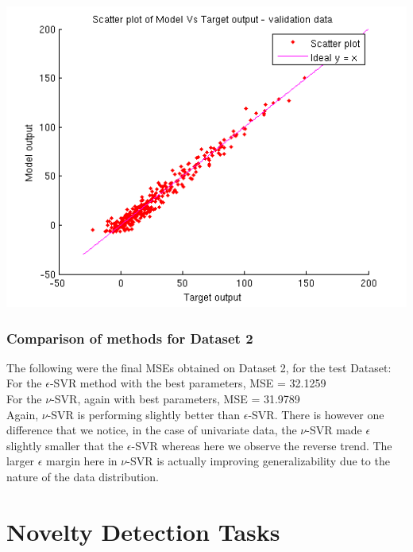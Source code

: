 \documentclass{article}
\begin{document}
\begin{center}
\includegraphics[scale=.6]{Regression/bivar/nu/scatter_val}
\end{center}
\newpage
\subsubsection{Comparison of methods for Dataset 2}
The following were the final MSEs obtained on Dataset 2, for the test Dataset: \\[5pt]
For the $\epsilon$-SVR method with the best parameters, MSE = 32.1259 \\
For the $\nu$-SVR, again with best parameters, MSE = 31.9789 \\[5pt]
Again, $\nu$-SVR is performing slightly better than $\epsilon$-SVR. There is however one difference that we notice, in the case of univariate data, the $\nu$-SVR made $\epsilon$ slightly smaller that the $\epsilon$-SVR whereas here we observe the reverse trend. The larger $\epsilon$ margin here in $\nu$-SVR is actually improving generalizability due to the nature of the data distribution.

















\section{Novelty Detection Tasks}
\end{document}
